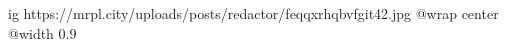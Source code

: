  
 
 
 
 

\ifcmt
  ig https://mrpl.city/uploads/posts/redactor/feqqxrhqbvfgit42.jpg
  @wrap center
  @width 0.9
\fi
